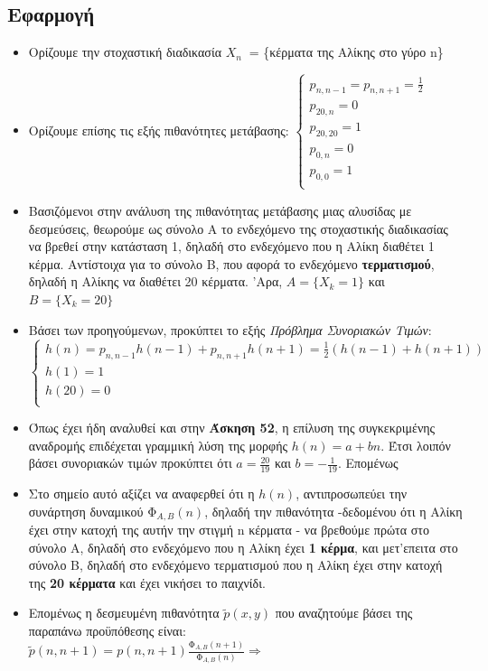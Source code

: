 \documentclass[a4paper,oneside, 11pt]{article}
\begin{document}
\subsection*{Εφαρμογή}
\begingroup
\begin{itemize}
	\item Ορίζουμε την στοχαστική διαδικασία $X_n\ $ = \{κέρματα της Αλίκης στο γύρο n\}
	\item Ορίζουμε επίσης τις εξής πιθανότητες μετάβασης:
	$\begin{cases}
	p_{n,n-1} = p_{n, n+1} = \frac{1}{2} \\ 
	p_{20,n} = 0 \\
	p_{20,20} = 1 \\
	p_{0,n} = 0 \\
	p_{0,0} = 1\\
	\end{cases}$
	\item Βασιζόμενοι στην ανάλυση της πιθανότητας μετάβασης μιας αλυσίδας με δεσμεύσεις, θεωρούμε ως σύνολο Α το ενδεχόμενο της στοχαστικής διαδικασίας να βρεθεί στην κατάσταση 1, δηλαδή στο ενδεχόμενο που η Αλίκη διαθέτει 1 κέρμα. Αντίστοιχα για το σύνολο Β, που αφορά το ενδεχόμενο \textbf{τερματισμού}, δηλαδή η Αλίκης να διαθέτει 20 κέρματα. 'Αρα, $A = \{ X_k = 1\}$ και $Β = \{ X_k = 20\}$
	\item Βάσει των προηγούμενων, προκύπτει το εξής \textit{Πρόβλημα Συνοριακών Τιμών}: \\ 
	$\begin{cases}
	h(n) = p_{n,n-1}h(n-1) + p_{n,n+1}h(n+1) = \frac{1}{2}( h(n-1) + h(n+1)) \\
	h(1) = 1 \\
	h(20) = 0\\
	\end{cases}$
	\item Όπως έχει ήδη αναλυθεί και στην \textbf{Άσκηση 52}, η επίλυση της συγκεκριμένης αναδρομής επιδέχεται γραμμική λύση της μορφής $h(n) = a + bn$. Έτσι λοιπόν βάσει συνοριακών τιμών προκύπτει ότι $a = \frac{20}{19}$ και $b = - \frac{1}{19}$. Eπομένως 
	\item Στο σημείο αυτό αξίζει να αναφερθεί ότι η $h(n)$, αντιπροσωπεύει την συνάρτηση δυναμικού $\text{Φ}_{A,B}(n) $, δηλαδή την πιθανότητα -δεδομένου ότι η Αλίκη έχει στην κατοχή της αυτήν την στιγμή n κέρματα - να βρεθούμε πρώτα στο σύνολο Α, δηλαδή στο ενδεχόμενο που η Αλίκη έχει \textbf{1 κέρμα}, και μετ'επειτα στο σύνολο Β, δηλαδή στο ενδεχόμενο τερματισμού που η Αλίκη έχει στην κατοχή της \textbf{20 κέρματα} και έχει νικήσει το παιχνίδι.
	\item Επομένως η δεσμευμένη πιθανότητα $\tilde{p}(x,y)$ που αναζητούμε βάσει της παραπάνω προϋπόθεσης είναι: \\
	$\tilde{p}(n, n+1) = p(n,n+1) \frac{\text{Φ}_{Α,Β}(n+1)}{\text{Φ}_{A,B}(n)} \Rightarrow$ 
	
	
\end{itemize}
\endgroup
\end{document}
